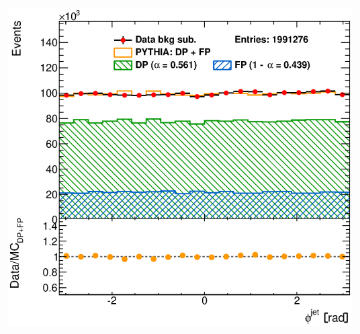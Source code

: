 \documentclass[12pt, twoside]{article}
\numberwithin{equation}{section}
\numberwithin{figure}{section}
\newenvironment{changemargin}[2]{%
\begin{list}{}{%
\setlength{\topsep}{0pt}%
\setlength{\leftmargin}{#1}%
\setlength{\rightmargin}{#2}%
\setlength{\listparindent}{\parindent}%
\setlength{\itemindent}{\parindent}%
\setlength{\parsep}{\parskip}%
}%
\item[]}{\end{list}}
\begin{document}
\begin{figure}[H]
\begin{changemargin}{-1.0cm}{-0.75cm}
\begin{changemargin}{-0.75cm}{-1.0cm}
\begin{subfigure}[b]{0.37\textwidth}
            \subcaption{}
            \label{fig:BSRapidityJetPYTHIA_Optimised}
        \end{subfigure}
        \begin{subfigure}[b]{0.37\textwidth}
            \includegraphics[width=\textwidth]{./images/BackgroundSubtractedPythiaOptimised/OPT_SIG_EVENTS-106.eps}
            \subcaption{}
            \label{fig:BSPhiJetPYTHIA_Optimised}
        \end{subfigure}


\end{changemargin}
\end{changemargin}
\end{figure}
\end{document}

